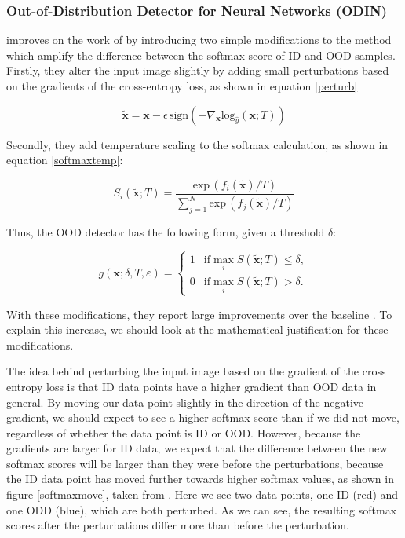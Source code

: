 \documentclass[UKenglish]{uiomasterthesis} %
\theoremstyle{definition}
\begin{document}
\subsubsection{Out-of-Distribution Detector for Neural Networks (ODIN)} \label{ood_odin}

\cite{odin} improves on the work of \cite{oodbaseline} by introducing two simple modifications to the method which amplify the difference between the softmax score of ID and OOD samples. Firstly, they alter the input image slightly by adding small perturbations based on the gradients of the cross-entropy loss, as shown in equation \ref{perturb}

\begin{equation}
\tilde{\bm{x}} = \bm{x} - \epsilon \, \text{sign}(-\nabla_{\bm{x}} \text{log}_{\hat{y}}(\bm{x};T))
\label{perturb}
\end{equation}

Secondly, they add temperature scaling to the softmax calculation, as shown in equation \ref{softmaxtemp}:

\begin{equation}
S_i(\tilde{\bm{x}} ; T) = \frac{\text{exp} \, (f_i(\tilde{\bm{x}})/T)}{\sum^N_{j=1} \text{exp} \, (f_j(\tilde{\bm{x}})/T)}
\label{softmaxtemp}
\end{equation}

Thus, the OOD detector has the following form, given a threshold $\delta$:

\begin{equation}
g(\bm{x};\delta,T,\varepsilon)=\left\{\begin{matrix}1&\text{if} \max_{i}S(\tilde{\bm{x}};T)\le\delta,\\ 0&\text{if} \max_{i}S(\tilde{\bm{x}};T)>\delta. \end{matrix}\right.
\label{fullodin}
\end{equation}

With these modifications, they report large improvements over the baseline \cite[4]{odin}. To explain this increase, we should look at the mathematical justification for these modifications.

The idea behind perturbing the input image based on the gradient of the cross entropy loss is that ID data points have a higher gradient than OOD data in general. By moving our data point slightly in the direction of the negative gradient, we should expect to see a higher softmax score than if we did not move, regardless of whether the data point is ID or OOD. However, because the gradients are larger for ID data, we expect that the difference between the new softmax scores will be larger than they were before the perturbations, because the ID data point has moved further towards higher softmax values, as shown in figure \ref{softmaxmove}, taken from \cite[8]{odin}. Here we see two data points, one ID (red) and one ODD (blue), which are both perturbed. As we can see, the resulting softmax scores after the perturbations differ more than before the perturbation.
\end{document}
